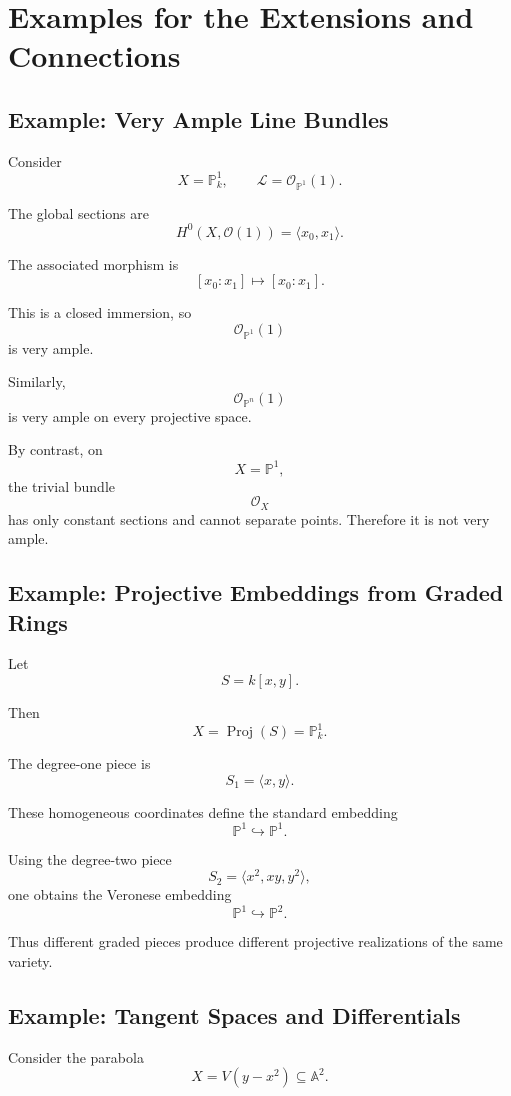 \documentclass[12pt,a4paper]{article}
\theoremstyle{notespace}
\begin{document}
\section{Examples for the Extensions and Connections}

\subsection{Example: Very Ample Line Bundles}

Consider
\[
X=\mathbb P^1_k,
\qquad
\mathcal L=\mathcal O_{\mathbb P^1}(1).
\]

The global sections are
\[
H^0(X,\mathcal O(1))
=
\langle x_0,x_1\rangle.
\]

The associated morphism is
\[
[x_0:x_1]
\mapsto
[x_0:x_1].
\]

This is a closed immersion, so
\[
\mathcal O_{\mathbb P^1}(1)
\]
is very ample.

Similarly,
\[
\mathcal O_{\mathbb P^n}(1)
\]
is very ample on every projective space.

By contrast, on
\[
X=\mathbb P^1,
\]
the trivial bundle
\[
\mathcal O_X
\]
has only constant sections and cannot separate points. Therefore it is not very ample.

\subsection{Example: Projective Embeddings from Graded Rings}

Let
\[
S=k[x,y].
\]

Then
\[
X=\operatorname{Proj}(S)
=
\mathbb P^1_k.
\]

The degree-one piece is
\[
S_1
=
\langle x,y\rangle.
\]

These homogeneous coordinates define the standard embedding
\[
\mathbb P^1
\hookrightarrow
\mathbb P^1.
\]

Using the degree-two piece
\[
S_2
=
\langle x^2,xy,y^2\rangle,
\]
one obtains the Veronese embedding
\[
\mathbb P^1
\hookrightarrow
\mathbb P^2.
\]

Thus different graded pieces produce different projective realizations of the same variety.

\subsection{Example: Tangent Spaces and Differentials}

Consider the parabola
\[
X=V(y-x^2)
\subseteq
\mathbb A^2.
\]
\end{document}
